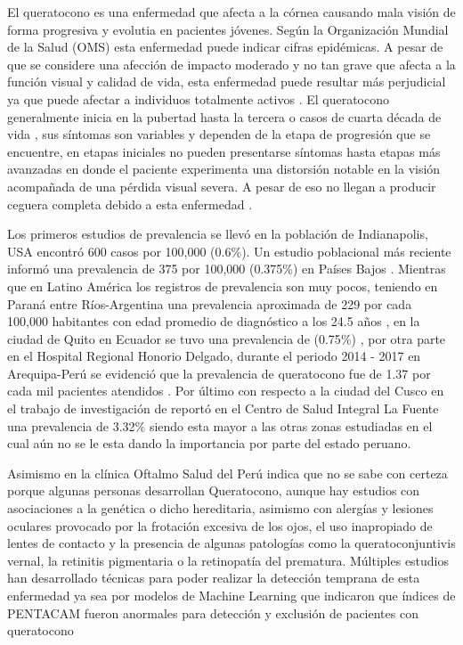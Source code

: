 El queratocono es una enfermedad que afecta a la córnea causando mala visión de forma progresiva y evolutia en pacientes jóvenes. Según la Organización Mundial de la Salud (OMS) esta enfermedad puede indicar cifras epidémicas. A pesar de que se considere una afección de impacto moderado y no tan grave que afecta a la función visual y calidad de vida, esta enfermedad puede resultar más perjudicial ya que puede afectar a individuos totalmente activos \citep{thalasselis1988keratoconus}. El queratocono generalmente inicia en la pubertad hasta la tercera o casos de cuarta década de vida \citep{althomali2018prevalence}, sus síntomas son variables y dependen de la etapa de progresión que se encuentre, en etapas iniciales no pueden presentarse síntomas hasta etapas más avanzadas en donde el paciente experimenta una distorsión notable en la visión acompañada de una pérdida visual severa. A pesar de eso no llegan a producir ceguera completa debido a esta enfermedad \citep{rabinowitz1998keratoconus}. 

Los primeros estudios de prevalencia se llevó en la población de Indianapolis, USA encontró 600 casos por 100,000 (0.6$\%$). Un estudio poblacional más reciente informó una prevalencia de 375 por 100,000 (0.375$\%$) en Países Bajos \citep{godefrooij2017age}. Mientras que en Latino América  los registros de prevalencia son muy pocos, teniendo en Paraná entre Ríos-Argentina una prevalencia aproximada de 229 por cada 100,000 habitantes con edad promedio de diagnóstico a los 24.5 años \citep{pussetto2011alta}, en la ciudad de Quito en Ecuador se tuvo una prevalencia de (0.75$\%$) \citep{mansfield2017queratocono}, por otra parte en el Hospital Regional Honorio Delgado, durante el periodo 2014 - 2017 en Arequipa-Perú se evidenció que la prevalencia de queratocono fue de 1.37 por cada mil pacientes atendidos \citep{ramos2018prevalencia}. Por último con respecto a la ciudad del Cusco en el trabajo de investigación de \citep{samaniego2023prevalencia} reportó en el Centro de Salud Integral La Fuente una prevalencia de 3.32$\%$ siendo esta mayor a las otras zonas estudiadas en el cual aún no se le esta dando la importancia por parte del estado peruano.

Asimismo en la clínica Oftalmo Salud del Perú indica que no se sabe con certeza porque algunas personas desarrollan Queratocono, aunque hay estudios con asociaciones a la genética o dicho hereditaria, asimismo con alergías y lesiones oculares provocado por la frotación excesiva de los ojos, el uso inapropiado de lentes de contacto y la presencia de algunas patologías como la queratoconjuntivis vernal, la retinitis pigmentaria o la retinopatía del prematura. Múltiples estudios han desarrollado técnicas para poder realizar la detección temprana de esta enfermedad ya sea por modelos de Machine Learning que indicaron que índices de PENTACAM fueron anormales para detección y exclusión de pacientes con queratocono \citep{zhao2024evaluation}


